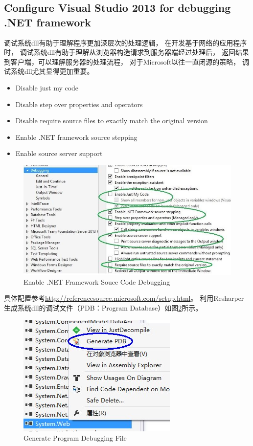 \documentclass{book}
\begin{document}
\subsection{Configure Visual Studio 2013 for debugging .NET framework}

调试系统dll有助于理解程序更加深层次的处理逻辑，
在开发基于网络的应用程序时，
调试系统dll有助于理解从浏览器构造请求到服务器端经过处理后，
返回结果到客户端，可以理解服务器的处理流程，
对于Microsoft以往一直闭源的策略，
调试系统dll尤其显得更加重要。

\begin{itemize}
	\item{Disable just my code}
	\item{Disable step over properties and operators}
	\item{Disable require source files to exactly match the original version}
	\item{Enable .NET framework source stepping}
	\item{Enable source server support}
\end{itemize}

\begin{figure}[htbp]
	\centering
	\includegraphics[scale=0.6]{EnableNetFrameworkSourceCodeDebugging.jpg}
	\caption{Enable .NET Framework Souce Code Debugging}
	\label{fig:EnableNetFrameworkSourceCodeDebugging}
\end{figure}

具体配置参考\url{http://referencesource.microsoft.com/setup.html}。
利用Resharper生成系统dll的调试文件（PDB：Program Database）如图\ref{fig:GenerateProgramDebuggingFile}所示。

\begin{figure}[htbp]
	\centering
	\includegraphics[scale=0.6]{GenerateProgramDebuggingFile.jpg}
	\caption{Generate Program Debugging File}
	\label{fig:GenerateProgramDebuggingFile}
\end{figure}
\end{document}
